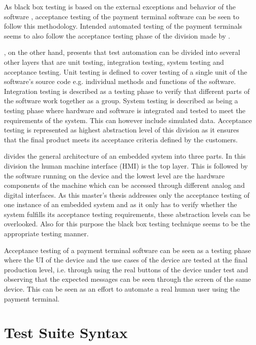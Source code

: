 As black box testing is based on the external exceptions and behavior of the software \emph{\citep{khan2012comparative}}, acceptance testing of the payment terminal software can be seen to follow this methodology. Intended automated testing of the payment terminals seems to also follow the acceptance testing phase of the division made by \emph{\cite{khan2012comparative}}.

\emph{\cite{huizinga2007automated}}, on the other hand, presents that test automation can be divided into several other layers that are unit testing, integration testing, system testing and acceptance testing. Unit testing is defined to cover testing of a single unit of the software's source code e.g. individual methods and functions of the software. Integration testing is described as a testing phase to verify that different parts of the software work together as a group. System testing is described as being a testing phase where hardware and software is integrated and tested to meet the requirements of the system. This can however include simulated data. Acceptance testing is represented as highest abstraction level of this division as it ensures that the final product meets its acceptance criteria defined by the customers.

\emph{\cite{Ramler}} divides the general architecture of an embedded system into three parts. In this division the human machine interface (HMI) is the top layer. This is followed by the software running on the device and the lowest level are the hardware components of the machine which can be accessed through different analog and digital interfaces. As this master's thesis addresses only the acceptance testing of one instance of an embedded system and as it only has to verify whether the system fulfills its acceptance testing requirements, these abstraction levels can be overlooked. Also for this purpose the black box testing technique seems to be the appropriate testing manner.

Acceptance testing of a payment terminal software can be seen as a testing phase where the UI of the device and the use cases of the device are tested at the final production level, i.e. through using the real buttons of the device under test and observing that the expected messages can be seen through the screen of the same device. This can be seen as an effort to automate a real human user using the payment terminal.

\section{Test Suite Syntax}
\label{section:test suite syntax}

